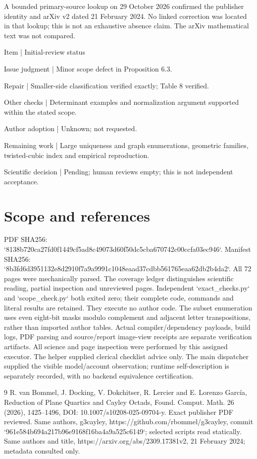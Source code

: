 \documentclass[10pt]{article}
\begin{document}
A bounded primary-source lookup on 29 October 2026 confirmed the publisher identity and arXiv v2 dated 21 February 2024. No linked correction was located in that lookup; this is not an exhaustive absence claim. The arXiv mathematical text was not compared.\par
Item | Initial-review status\par
Issue judgment | Minor scope defect in Proposition 6.3.\par
Repair | Smaller-side classification verified exactly; Table 8 verified.\par
Other checks | Determinant examples and normalization argument supported within the stated scope.\par
Author adoption | Unknown; not requested.\par
Remaining work | Large uniqueness and graph enumerations, geometric families, twisted-cubic index and empirical reproduction.\par
Scientific decision | Pending; human reviews empty; this is not independent acceptance.\par
\section*{Scope and references}
PDF SHA256: `8138b720ca27fd0f1449cf5ad8c49073d60f50dc5cba670742c00ccfa03ec946`. Manifest SHA256: `8b3fd6d3951132e8d2910f7a9a9991c1048eaad37cdbb561765eaa62db2b4da2`. All 72 pages were mechanically parsed. The coverage ledger distinguishes scientific reading, partial inspection and unreviewed pages. Independent `exact\_checks.py` and `scope\_check.py` both exited zero; their complete code, commands and literal results are retained. They execute no author code. The subset enumeration uses even eight-bit masks modulo complement and adjacent letter transpositions, rather than imported author tables. Actual compiler/dependency payloads, build logs, PDF parsing and source/report image-view receipts are separate verification artifacts. All science and page inspection were performed by this assigned executor. The helper supplied clerical checklist advice only. The main dispatcher supplied the visible model/account observation; runtime self-description is separately recorded, with no backend equivalence certification.\par
9 R. van Bommel, J. Docking, V. Dokchitser, R. Lercier and E. Lorenzo García, Reduction of Plane Quartics and Cayley Octads, Found. Comput. Math. 26 (2026), 1425–1496, DOI: 10.1007/s10208-025-09704-y. Exact publisher PDF reviewed. Same authors, g3cayley, https://github.com/rbommel/g3cayley, commit `961e584b694a217b96e9168f16ba4a9a525c6149`; selected scripts read statically. Same authors and title, https://arxiv.org/abs/2309.17381v2, 21 February 2024; metadata consulted only.\par
\end{document}
